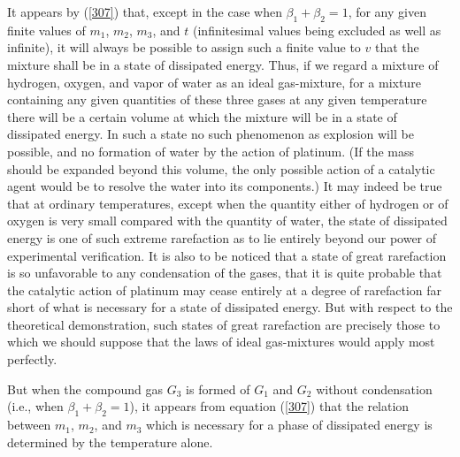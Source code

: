 \documentclass[12pt]{article}
\begin{document}
It appears by (\ref{307}) that, except in the case when $\beta_1+\beta_2=1$, for any given finite values of $m_1$, $m_2$, $m_3$, and $t$ (infinitesimal values being excluded as well as infinite), it will always be possible to assign such a finite value to $v$ that the mixture shall be in a state of dissipated energy. 
Thus, if we regard a mixture of hydrogen, oxygen, and vapor of water as an ideal gas-mixture, for a mixture containing any given quantities of these three gases at any given temperature there will be a certain volume at which the mixture will be in a state of dissipated energy. 
In such a state no such phenomenon as explosion will be possible, and no formation of water by the action of platinum. (If the mass should be expanded beyond this volume, the only possible action of a catalytic agent would be to resolve the water into its components.) It may indeed be true that at ordinary temperatures, except when the quantity either of hydrogen or of oxygen is very small compared with the quantity of water, the state of dissipated energy is one of such extreme rarefaction as to lie entirely beyond our power of experimental verification. It is also to be noticed that a state of great rarefaction is so unfavorable to any condensation of the gases, that it is quite probable that the catalytic action of platinum may cease entirely at a degree of rarefaction far short of what is necessary for a state of dissipated energy. But with respect to the theoretical demonstration, such states of great rarefaction are precisely those to which we should suppose that the laws of ideal gas-mixtures would apply most perfectly.


But when the compound gas $G_3$ is formed of $G _1$ and $G_2$ without condensation (i.e., when $\beta_1+\beta_2=1$), it appears from equation (\ref{307}) that the relation between $m_1$, $m_2$, and $m_3$ which is necessary for a phase of dissipated energy is determined by the temperature alone.
\end{document}
